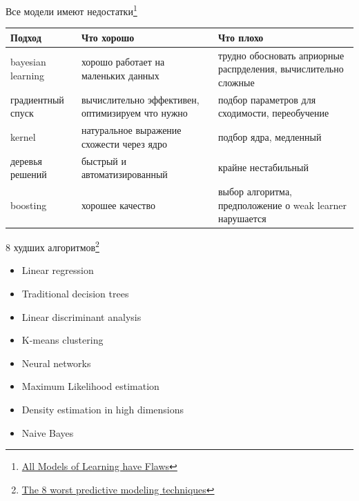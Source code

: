 \documentclass[10pt]{beamer}
\begin{document}
\begin{frame}{Все модели имеют недостатки\footnote{\href{http://web.archive.org/web/20140326142656/http://hunch.net/?p=224}{All Models of Learning have Flaws}}}

\begin{tabular}{| p{2cm} | p{3.6cm} | p{3.6cm} |}
\hline
Подход & Что хорошо & Что плохо \\
\hline
\hline
bayesian learning & хорошо работает на маленьких данных & трудно обосновать априорные распрделения, вычислительно сложные \\ \hline
градиентный спуск & вычислительно эффективен, оптимизируем что нужно & подбор параметров для сходимости, переобучение \\ \hline
kernel & натуральное выражение схожести через ядро & подбор ядра, медленный \\ \hline
деревья решений & быстрый и автоматизированный & крайне нестабильный \\ \hline
boosting & хорошее качество & выбор алгоритма, предположение о weak learner нарушается  \\
\hline
\end{tabular}

\end{frame}

\begin{frame}{8 худших алгоритмов\footnote{\href{http://www.analyticbridge.com/profiles/blogs/the-8-worst-predictive-modeling-techniques}{The 8 worst predictive modeling techniques}}}

\begin{itemize}
\item Linear regression
\item Traditional decision trees
\item Linear discriminant analysis
\item K-means clustering
\item Neural networks
\item Maximum Likelihood estimation
\item Density estimation in high dimensions
\item Naive Bayes
\end{itemize}

\end{frame}
\end{document}
